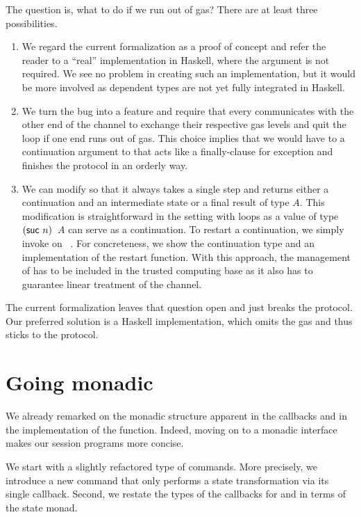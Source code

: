 \documentclass[acmsmall,screen,anonymous,review]{acmart}
\begin{document}
The question is, what to do if we run out of gas?
There are at least three possibilities.
\begin{enumerate}
\item We regard the current formalization as a proof of concept and
  refer the reader to a ``real'' implementation in Haskell, where the
   argument is not required. We see no
  problem in creating such an implementation, but it would be more
  involved as dependent types are not yet fully integrated in Haskell.
\item We turn the bug into a feature and require that every
  {\ACONTINUE} communicates with the other end of the channel to
  exchange their respective gas levels and quit the loop if one end
  runs out of gas. This choice implies that we would have to a
  continuation argument to  {\ACONTINUE} that acts like a
  finally-clause for exception and finishes the protocol in an orderly
  way.
\item We can modify {\Aexecutor} so that it always takes a single step
  and returns either a continuation and an intermediate state or a
  final result of type $A$. This modification is straightforward in 
  the setting with loops as a value  of type {\ACommandStore~$(\Asuc~n)$~$A$}
  can serve as a continuation. To restart a continuation, we simply invoke
  {\Aexecutor} on ~\Azero. For concreteness, we show
  the continuation type and an implementation of the restart function.
  \rstAlternativeExecutorRestart
  With this approach, the management of {\Arestart}  has to be
  included in the trusted computing base as it also has to guarantee linear treatment of
  the channel.
\end{enumerate}
The current formalization leaves that question open and just breaks
the protocol. Our preferred solution is a Haskell implementation,
which omits the gas and thus sticks to the protocol.

\section{Going monadic}
\label{sec:going-monadic}


We already remarked on the monadic structure apparent in the
callbacks and in the implementation of the {\Aexecutor}
function. Indeed, moving on to a monadic interface makes our session
programs more concise.

We start with a slightly refactored type of commands. More precisely,
we introduce a new {\ACSKIP} command that only performs a state 
transformation via its single callback.
Second, we restate the types of the callbacks for {\ACSEND} and
{\ACRECV} in terms of the state monad.
\end{document}
